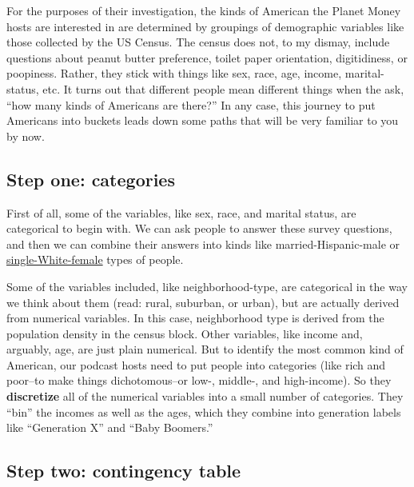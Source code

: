 \documentclass[openany]{book}
\begin{document}
For the purposes of their investigation, the kinds of American the Planet Money hosts are interested in are determined by groupings of demographic variables like those collected by the US Census. The census does not, to my dismay, include questions about peanut butter preference, toilet paper orientation, digitidiness, or poopiness. Rather, they stick with things like sex, race, age, income, marital-status, etc. It turns out that different people mean different things when the ask, ``how many kinds of Americans are there?'' In any case, this journey to put Americans into buckets leads down some paths that will be very familiar to you by now.

\hypertarget{step-one-categories}{%
\subsection*{Step one: categories}\label{step-one-categories}}

First of all, some of the variables, like sex, race, and marital status, are categorical to begin with. We can ask people to answer these survey questions, and then we can combine their answers into kinds like married-Hispanic-male or \href{https://www.imdb.com/title/tt0105414/}{single-White-female} types of people.

Some of the variables included, like neighborhood-type, are categorical in the way we think about them (read: rural, suburban, or urban), but are actually derived from numerical variables. In this case, neighborhood type is derived from the population density in the census block. Other variables, like income and, arguably, age, are just plain numerical. But to identify the most common kind of American, our podcast hosts need to put people into categories (like rich and poor--to make things dichotomous--or low-, middle-, and high-income). So they \textbf{discretize} all of the numerical variables into a small number of categories. They ``bin'' the incomes as well as the ages, which they combine into generation labels like ``Generation X'' and ``Baby Boomers.''

\hypertarget{step-two-contingency-table}{%
\subsection*{Step two: contingency table}\label{step-two-contingency-table}}
\end{document}
